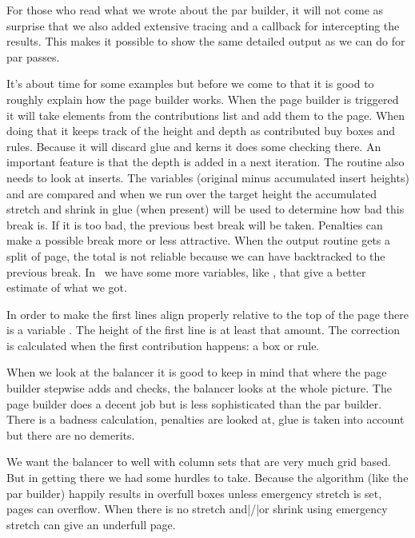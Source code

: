 \startitem
    For those who read what we wrote about the par builder, it will not come as
    surprise that we also added extensive tracing and a callback for intercepting
    the results. This makes it possible to show the same detailed output as we
    can do for par passes.
\stopitem

\stopitemize

It's about time for some examples but before we come to that it is good to
roughly explain how the page builder works. When the page builder is triggered it
will take elements from the contributions list and add them to the page. When
doing that it keeps track of the height and depth as contributed buy boxes and
rules. Because it will discard glue and kerns it does some checking there. An
important feature is that the depth is added in a next iteration. The routine
also needs to look at inserts. The variables \type {\pagegoal} (original \type
{\vsize} minus accumulated insert heights) and \type {\pagetotal} are compared
and when we run over the target height the accumulated stretch and shrink in glue
(when present) will be used to determine how bad this break is. If it is too bad,
the previous best break will be taken. Penalties can make a possible break more
or less attractive. When the output routine gets a split of page, the total is
not reliable because we can have backtracked to the previous break. In
\LUAMETATEX\ we have some more variables, like \type {\pagelastheight}, that give
a better estimate of what we got.

In order to make the first lines align properly relative to the top of the page
there is a variable \type {\topskip}. The height of the first line is at least
that amount. The correction is calculated when the first contribution happens: a
box or rule.

When we look at the balancer it is good to keep in mind that where the page
builder stepwise adds and checks, the balancer looks at the whole picture. The
page builder does a decent job but is less sophisticated than the par builder.
There is a badness calculation, penalties are looked at, glue is taken into
account but there are no demerits.

We want the balancer to well with column sets that are very much grid
based. But in getting there we had some hurdles to take. Because
the algorithm (like the par builder) happily results in overfull boxes unless
emergency stretch is set, pages can overflow. When there is no stretch
and|/|or shrink using emergency stretch can give an underfull page.

